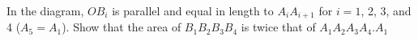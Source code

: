In the diagram, $OB_i$ is parallel and equal in length to $A_i A_{i + 1}$ for $i = 1$,  2, 3, and 4 ($A_5 = A_1$).  Show that the area of $B_1 B_2 B_3 B_4$ is twice that of $A_1 A_2 A_3 A_4$.$A_1$